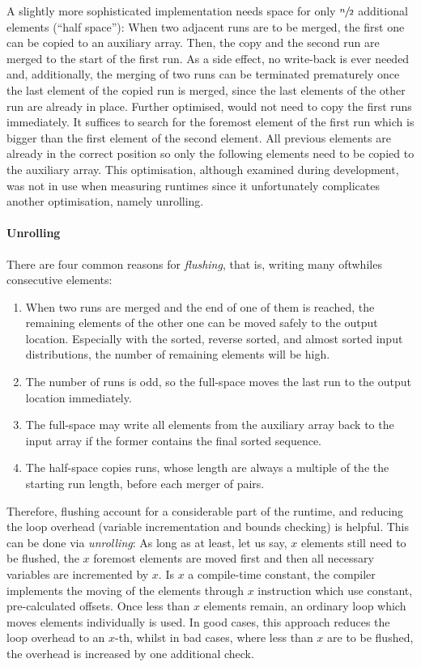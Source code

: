 A slightly more sophisticated implementation needs space for only \(\sfrac{n}{2}\) additional elements (\enquote{half space}):
When two adjacent runs are to be merged, the first one can be copied to an auxiliary array.
Then, the copy and the second run are merged to the start of the first run.
As a side effect, no write-back is ever needed and, additionally, the merging of two runs can be terminated prematurely once the last element of the copied run is merged, since the last elements of the other run are already in place.
Further optimised, \MS{} would not need to copy the first runs immediately.
It suffices to search for the foremost element of the first run which is bigger than the first element of the second element.
All previous elements are already in the correct position so only the following elements need to be copied to the auxiliary array.
This optimisation, although examined during development, was not in use when measuring runtimes since it unfortunately complicates another optimisation, namely unrolling.

\paragraph{Unrolling}
There are four common reasons for \emph{flushing}, that is, writing \Dash many oftwhiles \Dash consecutive elements:
\begin{enumerate}
	\item
	When two runs are merged and the end of one of them is reached, the remaining elements of the other one can be moved safely to the output location.
	Especially with the sorted, reverse sorted, and almost sorted input distributions, the number of remaining elements will be high.

	\item
	The number of runs is odd, so the full-space \MS{} moves the last run to the output location immediately.

	\item
	The full-space \MS{} may write all elements from the auxiliary array back to the input array if the former contains the final sorted sequence.

	\item
	The half-space \MS{} copies runs, whose length are always a multiple of the the starting run length, before each merger of pairs.
\end{enumerate}
Therefore, flushing account for a considerable part of the runtime, and reducing the loop overhead (variable incrementation and bounds checking) is helpful.
This can be done via \emph{unrolling}:
As long as at least, let us say, \(x\) elements still need to be flushed, the \(x\) foremost elements are moved first and then all necessary variables are incremented by \(x\).
Is \(x\) a compile-time constant, the compiler implements the moving of the elements through \(x\) instruction which use constant, pre-calculated offsets.
Once less than \(x\) elements remain, an ordinary loop which moves elements individually is used.
In good cases, this approach reduces the loop overhead to an \(x\)-th, whilst in bad cases, where less than \(x\) are to be flushed, the overhead is increased by one additional check.

